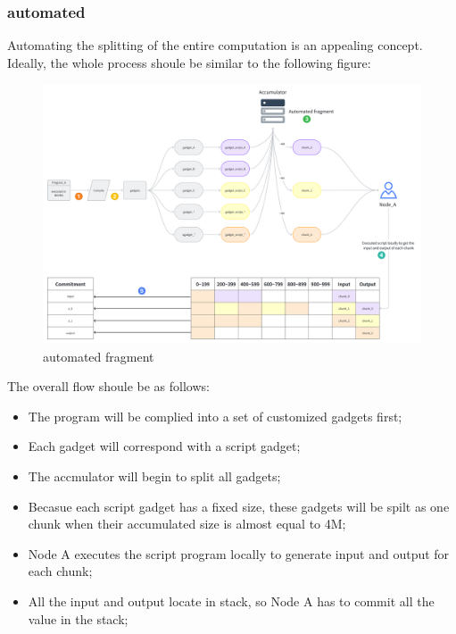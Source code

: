 \subsubsection{automated}

Automating the splitting of the entire computation is an appealing concept. Ideally, the whole process shoule be similar to the following figure:

\begin{figure}[ht] 
    \centering  
    \includegraphics[width=0.85\columnwidth]{images/automated-fragment.png} 
    \caption{automated fragment}
    \label{fig:automated-fragment}
\end{figure}

The overall flow shoule be as follows:
\begin{itemize}
    \item The program will be complied into a set of customized gadgets first;
    \item Each gadget will correspond with a script gadget;
    \item The accmulator will begin to split all gadgets;
    \item Becasue each script gadget has a fixed size, these gadgets will be spilt as one chunk when their accumulated size is almost equal to 4M;
    \item Node A executes the script program locally to generate input and output for each chunk;
    \item All the input and output locate in stack, so Node A has to commit all the value in the stack;
\end{itemize}

